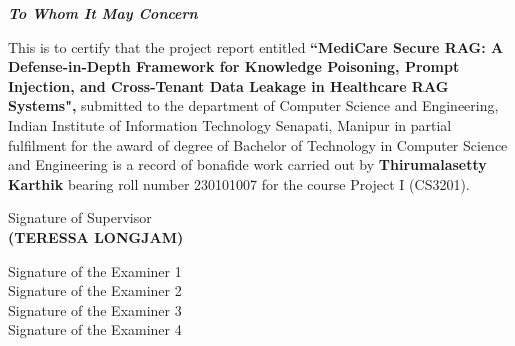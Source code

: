 \documentclass[a4paper, 11pt, oneside]{report}
\begin{document}
\begin{center}
{\Huge \textbf{\emph{To Whom It May Concern}}}

\vspace{1.2cm}

\linespread{1.1}
\large
This is to certify that the project report entitled 
\textbf{``MediCare Secure RAG: A Defense-in-Depth Framework for Knowledge Poisoning, Prompt Injection, and Cross-Tenant Data Leakage in Healthcare RAG Systems",}
submitted to the department of Computer Science and Engineering, Indian Institute of Information Technology Senapati, Manipur in partial fulfilment for the award of degree of Bachelor of Technology in Computer Science and Engineering is a record of bonafide work carried out by \textbf{Thirumalasetty Karthik} bearing roll number 230101007 for the course Project I (CS3201).
\end{center}

\vspace{0.8cm}

\begin{flushright}
\large Signature of Supervisor\\[0.2cm]
\textbf{(TERESSA LONGJAM)}
\end{flushright}

\vspace{1cm}

\noindent Signature of the Examiner 1 \hspace{0.1cm}\makebox[3cm]{\dotfill}\\[0.3cm]
\noindent Signature of the Examiner 2 \hspace{0.1cm}\makebox[3cm]{\dotfill}\\[0.3cm]
\noindent Signature of the Examiner 3 \hspace{0.1cm}\makebox[3cm]{\dotfill}\\[0.3cm]
\noindent Signature of the Examiner 4 \hspace{0.1cm}\makebox[3cm]{\dotfill}
\end{document}
